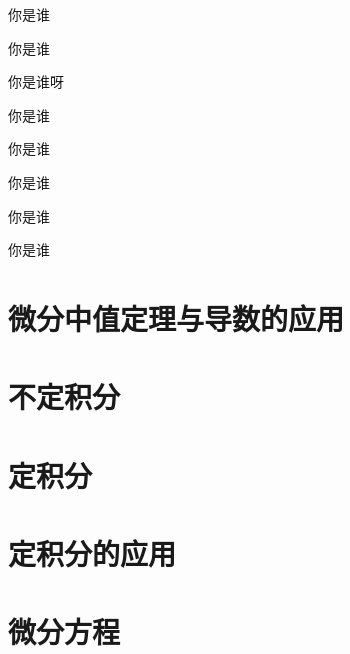 \documentclass[lang=cn,10pt]{elegantbook}
\begin{document}
\begin{solution}
	你是谁
\end{solution}

\begin{example}
	你是谁
\end{example}

\begin{problem}
	你是谁呀
\end{problem}

\begin{exercise}
	你是谁
\end{exercise}

\begin{theorem}
	你是谁
\end{theorem}

\begin{lemma}
	你是谁
\end{lemma}

\begin{corollary}
	你是谁
\end{corollary}

\begin{axiom}
	你是谁
\end{axiom}








\chapter{微分中值定理与导数的应用}



\chapter{不定积分}


\chapter{定积分}




\chapter{定积分的应用}



\chapter{微分方程}
\end{document}
